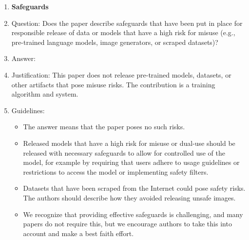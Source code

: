 \documentclass{article}
\begin{document}
\begin{enumerate}
\item {\bf Safeguards}
    \item[] Question: Does the paper describe safeguards that have been put in place for responsible release of data or models that have a high risk for misuse (e.g., pre-trained language models, image generators, or scraped datasets)?
    \item[] Answer: \answerNA{}
    \item[] Justification: This paper does not release pre-trained models, datasets, or other artifacts that pose misuse risks. The contribution is a training algorithm and system.
    \item[] Guidelines:
    \begin{itemize}
        \item The answer \answerNA{} means that the paper poses no such risks.
        \item Released models that have a high risk for misuse or dual-use should be released with necessary safeguards to allow for controlled use of the model, for example by requiring that users adhere to usage guidelines or restrictions to access the model or implementing safety filters. 
        \item Datasets that have been scraped from the Internet could pose safety risks. The authors should describe how they avoided releasing unsafe images.
        \item We recognize that providing effective safeguards is challenging, and many papers do not require this, but we encourage authors to take this into account and make a best faith effort.
    \end{itemize}


\end{enumerate}
\end{document}
